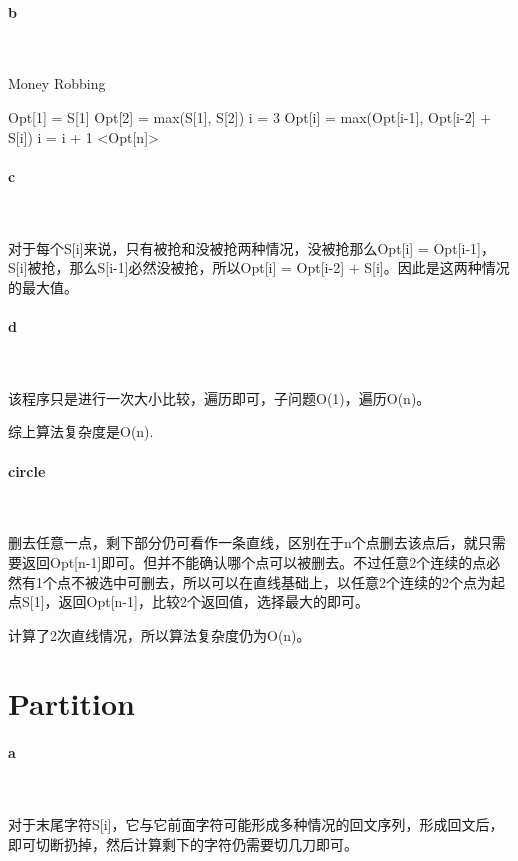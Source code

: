 \documentclass{article}
\begin{document}
		\paragraph{b}\
			\begin{algorithm}
				\caption{Money Robbing}
				\begin{algorithmic}
					\State Opt[1] = S[1]
					\State Opt[2] = max(S[1], S[2])
					\State i = 3
					\State Opt[i] = max(Opt[i-1], Opt[i-2] + S[i])
					\State i = i + 1
					\EndFor
					\State
					\Return <Opt[n]>
					\EndProcedure
				\end{algorithmic}
			\end{algorithm}
	
		\paragraph{c}\
		
			对于每个S[i]来说，只有被抢和没被抢两种情况，没被抢那么Opt[i] = Opt[i-1]，S[i]被抢，那么S[i-1]必然没被抢，所以Opt[i] = Opt[i-2] + S[i]。因此是这两种情况的最大值。
			
		\paragraph{d}\
		
			该程序只是进行一次大小比较，遍历即可，子问题O(1)，遍历O(n)。
		
			综上算法复杂度是O(n).
		\paragraph{circle}\
			
			删去任意一点，剩下部分仍可看作一条直线，区别在于n个点删去该点后，就只需要返回Opt[n-1]即可。但并不能确认哪个点可以被删去。不过任意2个连续的点必然有1个点不被选中可删去，所以可以在直线基础上，以任意2个连续的2个点为起点S[1]，返回Opt[n-1]，比较2个返回值，选择最大的即可。
			
			计算了2次直线情况，所以算法复杂度仍为O(n)。
	\section{Partition}
		\paragraph{a}\
		
		对于末尾字符S[i]，它与它前面字符可能形成多种情况的回文序列，形成回文后，即可切断扔掉，然后计算剩下的字符仍需要切几刀即可。
		\\
		
\end{document}
